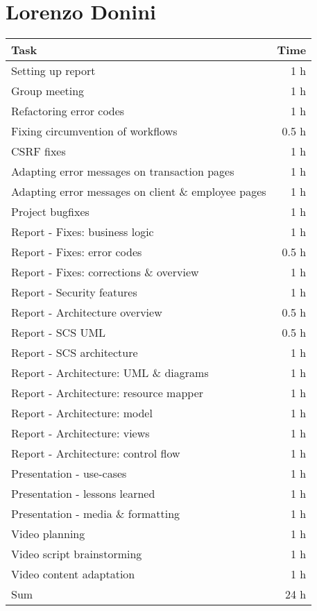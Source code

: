 \section*{Lorenzo Donini}
\begin{table}[h!tpb]
  \centering
  \begin{tabularx}{\textwidth}{X r}
    \toprule
      Task & Time \\
    \midrule
      Setting up report & 1 h \\      
      Group meeting & 1 h \\
      Refactoring error codes & 1 h \\
      Fixing circumvention of workflows & 0.5 h \\
      CSRF fixes & 1 h \\
      Adapting error messages on transaction pages & 1 h \\
      Adapting error messages on client \& employee pages & 1 h \\
      Project bugfixes & 1 h \\
      Report - Fixes: business logic & 1 h \\
      Report - Fixes: error codes & 0.5 h \\
      Report - Fixes: corrections \& overview & 1 h \\
      Report - Security features & 1 h \\
      Report - Architecture overview & 0.5 h \\
      Report - SCS UML & 0.5 h \\
      Report - SCS architecture & 1 h \\
      Report - Architecture: UML \& diagrams & 1 h \\
      Report - Architecture: resource mapper & 1 h \\
      Report - Architecture: model & 1 h \\
      Report - Architecture: views & 1 h \\
      Report - Architecture: control flow & 1 h \\
      Presentation - use-cases & 1 h \\
      Presentation - lessons learned & 1 h \\
      Presentation - media \& formatting & 1 h \\
      Video planning & 1 h \\
      Video script brainstorming & 1 h \\
      Video content adaptation & 1 h \\
    \midrule
      Sum & 24 h \\
    \bottomrule
  \end{tabularx}
\end{table}

